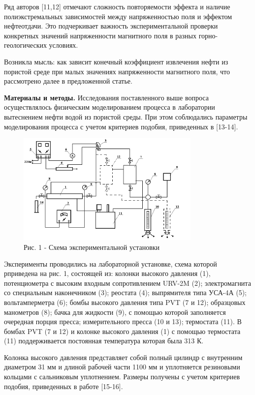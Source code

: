\begin{multicols}{2}
Ряд авторов {[}11,12{]} отмечают сложность повторяемости эффекта и
наличие полиэкстремальных зависимостей между напряженностью поля и
эффектом нефтеотдачи. Это подчеркивает важность экспериментальной
проверки конкретных значений напряженности магнитного поля в разных
горно-геологических условиях.

Возникла мысль: как зависит конечный коэффициент извлечения нефти из
пористой среде при малых значениях напряженности магнитного поля, что
рассмотрено далее в предложенной статье.

{\bfseries Материалы и методы.} Исследования поставленного выше вопроса
осуществлялось физическим моделированием процесса в лаборатории
вытеснением нефти водой из пористой среды. При этом соблюдались
параметры моделирования процесса с учетом критериев подобия, приведенных
в {[}13-14{]}.
\end{multicols}

\begin{figure}[H]
	\centering
	\includegraphics[width=0.8\textwidth]{media/gorn4/image2}
	\caption*{Рис. 1 - Схема экспериментальной установки}
\end{figure}

Эксперименты проводились на лабораторной установке, схема которой
рприведена на рис. 1, состоящей из: колонки высокого давления (1),
потенциометра с высоким входным сопротивлением URV-2M (2);
электромагнита со специальным наконечником (3); реостата (4);
выпрямителя типа УСА-4А (5); вольтамперметра (6); бомбы высокого
давления типа PVT (7 и 12); образцовых манометров (8); бачка для
жидкости (9), с помощью которой заполняется очередная порция пресса;
измерительного пресса (10 и 13); термостата (11). В бомбах PVT (7 и 12)
и колонке высокого давления (1) с помощью термостата (11) поддерживается
постоянная температура которая была 313 К.

Колонка высокого давления представляет собой полный цилиндр с внутренним
диаметром 31 мм и длиной рабочей части 1100 мм и уплотняется резиновыми
кольцами с сальниковым уплотнением. Размеры получены с учетом критериев
подобия, приведенных в работе {[}15-16{]}.

